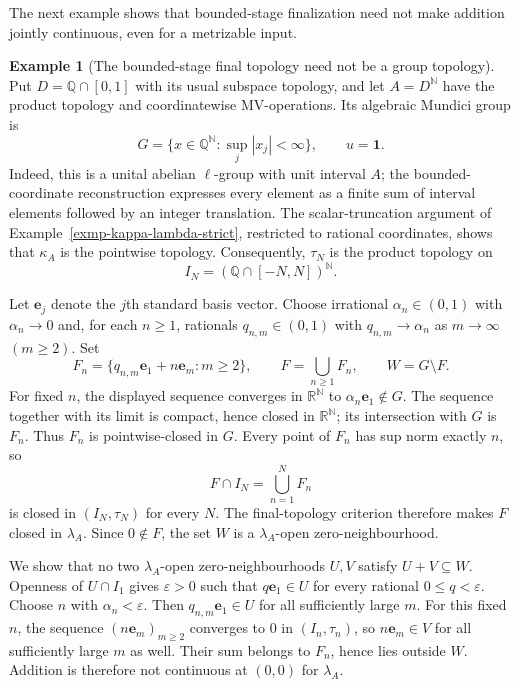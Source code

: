 \documentclass[preprint,3p]{elsarticle}
\theoremstyle{plain}
\theoremstyle{definition}
\newtheorem{exmp}[thm]{Example}
\numberwithin{equation}{section}
\begin{document}
The next example shows that bounded-stage finalization need not make
addition jointly continuous, even for a metrizable input.

\begin{exmp}[The bounded-stage final topology need not be a group topology]
\label{exmp-lambda-not-group}
Put $D=\mathbb Q\cap[0,1]$ with its usual subspace topology, and let
$A=D^{\mathbb N}$ have the product topology and coordinatewise
MV-operations.  Its algebraic Mundici group is
\[
 G=\{x\in\mathbb Q^{\mathbb N}:\sup_j|x_j|<\infty\},
 \qquad u=\mathbf1.
\]
Indeed, this is a unital abelian $\ell$-group with unit interval $A$;
the bounded-coordinate reconstruction expresses every element as a
finite sum of interval elements followed by an integer translation.
The scalar-truncation argument of
Example~\ref{exmp-kappa-lambda-strict}, restricted to rational
coordinates, shows that $\kappa_A$ is the pointwise topology.
Consequently, $\tau_N$ is the product topology on
\[
 I_N=(\mathbb Q\cap[-N,N])^{\mathbb N}.
\]

Let $\mathbf e_j$ denote the $j$th standard basis vector.
Choose irrational $\alpha_n\in(0,1)$ with $\alpha_n\to0$ and,
for each $n\geq1$, rationals $q_{n,m}\in(0,1)$ with
$q_{n,m}\to\alpha_n$ as $m\to\infty$ $(m\geq2)$.  Set
\[
 F_n=\{q_{n,m}\mathbf e_1+n\mathbf e_m:m\geq2\},
 \qquad F=\bigcup_{n\geq1}F_n,
 \qquad W=G\setminus F.
\]
For fixed $n$, the displayed sequence converges in
$\mathbb R^{\mathbb N}$ to $\alpha_n\mathbf e_1\notin G$.
The sequence together with its limit is compact, hence closed
in $\mathbb R^{\mathbb N}$; its intersection with $G$ is $F_n$.
Thus $F_n$ is pointwise-closed in $G$.
Every point of $F_n$ has sup norm exactly $n$, so
\[
 F\cap I_N=\bigcup_{n=1}^N F_n
\]
is closed in $(I_N,\tau_N)$ for every $N$.
The final-topology criterion therefore makes $F$ closed in
$\lambda_A$.  Since $0\notin F$, the set $W$ is a
$\lambda_A$-open zero-neighbourhood.

We show that no two $\lambda_A$-open zero-neighbourhoods $U,V$
satisfy $U+V\subseteq W$.
Openness of $U\cap I_1$ gives $\varepsilon>0$ such that
$q\mathbf e_1\in U$ for every rational $0\leq q<\varepsilon$.
Choose $n$ with $\alpha_n<\varepsilon$.  Then
$q_{n,m}\mathbf e_1\in U$ for all sufficiently large $m$.
For this fixed $n$, the sequence $(n\mathbf e_m)_{m\geq2}$ converges to $0$
in $(I_n,\tau_n)$, so $n\mathbf e_m\in V$ for all sufficiently
large $m$ as well.  Their sum belongs to $F_n$, hence lies
outside $W$.  Addition is therefore not continuous at $(0,0)$
for $\lambda_A$.
\end{exmp}
\end{document}
